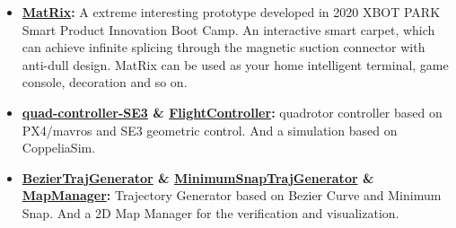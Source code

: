 \documentclass[11pt,a4paper,sans]{moderncv}        %
\begin{document}
\begin{itemize}
\item \textbf{\href{https://www.bilibili.com/video/BV1gb4y127by?share_source=copy_web}{MatRix}:} A extreme interesting prototype developed in 2020 XBOT PARK Smart Product Innovation Boot Camp. An interactive smart carpet, which can achieve infinite splicing through the magnetic suction connector with anti-dull design. MatRix can be used as your home intelligent terminal, game console, decoration and so on.



\item \textbf{\href{https://github.com/jianhengLiu/quad_controller_SE3}{quad-controller-SE3} \& \href{https://github.com/jianhengLiu/FlightController}{FlightController}:} quadrotor controller based on PX4/mavros and SE3 geometric control. And a simulation based on CoppeliaSim. 




\item \textbf{\href{https://github.com/jianhengLiu/BezierTrajGenerator}{BezierTrajGenerator} \& \href{https://github.com/jianhengLiu/MinimumSnapTrajGenerator}{MinimumSnapTrajGenerator} \& 
\href{https://github.com/jianhengLiu/MapManager}{MapManager}:} Trajectory Generator based on Bezier Curve and Minimum Snap. And a 2D Map Manager for the verification and visualization.



\end{itemize}
\end{document}
